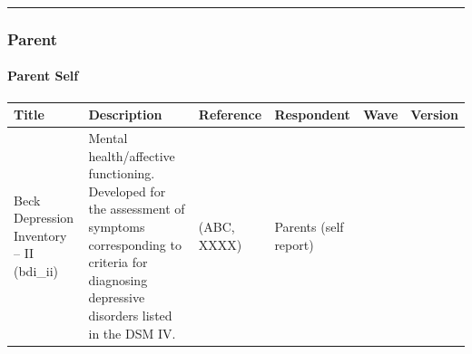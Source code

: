 \documentclass[]{book}
\let\oldparagraph\paragraph
\renewcommand{\paragraph}[1]{\oldparagraph{#1}\mbox{}}
\begin{document}
\begin{center}\rule{0.5\linewidth}{0.5pt}\end{center}

\hypertarget{parent}{%
\subsubsection{Parent}\label{parent}}

\hypertarget{parent-self}{%
\paragraph{Parent Self}\label{parent-self}}

\begin{longtable}[]{@{}llllll@{}}
\toprule
\begin{minipage}[b]{0.18\columnwidth}\raggedright
Title\strut
\end{minipage} & \begin{minipage}[b]{0.18\columnwidth}\raggedright
Description\strut
\end{minipage} & \begin{minipage}[b]{0.15\columnwidth}\raggedright
Reference\strut
\end{minipage} & \begin{minipage}[b]{0.16\columnwidth}\raggedright
Respondent\strut
\end{minipage} & \begin{minipage}[b]{0.06\columnwidth}\raggedright
Wave\strut
\end{minipage} & \begin{minipage}[b]{0.10\columnwidth}\raggedright
Version\strut
\end{minipage}\tabularnewline
\midrule
\endhead
\begin{minipage}[t]{0.18\columnwidth}\raggedright
Beck Depression Inventory -- II (bdi\_ii)\strut
\end{minipage} & \begin{minipage}[t]{0.18\columnwidth}\raggedright
Mental health/affective functioning. Developed for the assessment of symptoms corresponding to criteria for diagnosing depressive disorders listed in the DSM IV.\strut
\end{minipage} & \begin{minipage}[t]{0.15\columnwidth}\raggedright
(ABC, XXXX)\strut
\end{minipage} & \begin{minipage}[t]{0.16\columnwidth}\raggedright
Parents (self report)\strut
\end{minipage} & \begin{minipage}[t]{0.06\columnwidth}\raggedright

\end{minipage}
\end{longtable}
\end{document}
